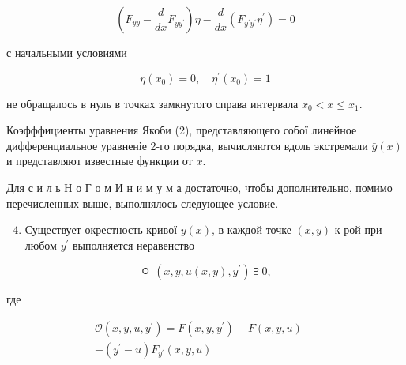 \documentclass[10pt]{article}
\begin{document}
\[

\left(F_{y y}-\frac{d}{d x} F_{y y^{\prime}}\right) \eta-\frac{d}{d x}\left(F_{y^{\prime} y^{\prime}} \eta^{\prime}\right)=0

\]



с начальными условиями



\[

\eta\left(x_{0}\right)=0, \quad \eta^{\prime}\left(x_{0}\right)=1

\]



не обращалось в нуль в точках замкнутого справа интервала $x_{0}<x \leqslant x_{1}$.



Коэфффициенты уравнения Якоби (2), представляющего собої линейное дифференциальное уравненіе 2-го порядка, вычисляются вдоль экстремали $\bar{y}(x)$ и представляют известные функции от $x$.



Для с и л ь Н о Г о м И н и м у м а достаточно, чтобы дополнительно, помимо перечисленных выше, выполнялось следующее условие.



\begin{enumerate}

  \setcounter{enumi}{3}

  \item Существует окрестность кривої $\bar{y}(x)$, в каждой точке $(x, y)$ к-рой при любом $y^{\prime}$ выполняется неравенство

\end{enumerate}



\[

\text { ㅇ }\left(x, y, u(x, y), y^{\prime}\right) \supseteqq 0 \text {, }

\]



где



\[

\begin{gathered}

\mathscr{O}\left(x, y, u, y^{\prime}\right)=F\left(x, y, y^{\prime}\right)-F(x, y, u)- \\

-\left(y^{\prime}-u\right) F_{y^{\prime}}(x, y, u)

\end{gathered}

\]
\end{document}
